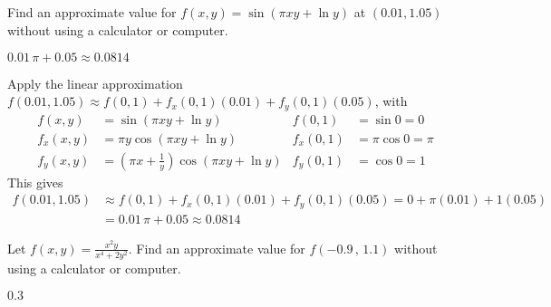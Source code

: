 \subsection*{\Procedural}

\begin{question}
Find an approximate value for $f(x,y)=\sin(\pi xy+\ln y)$ at $(0.01,1.05)$
without using a calculator or computer.
\end{question}

%

\begin{answer}
$0.01\,\pi + 0.05 \approx 0.0814$
\end{answer}

\begin{solution}
Apply the linear approximation 
$f(0.01,1.05)\approx f(0,1)+f_x(0,1)(0.01)+f_y(0,1)(0.05)$,
with 
\begin{align*}
f(x,y)&=\sin(\pi xy+\ln y) & f(0,1)&=\sin 0=0\\
f_x(x,y)&=\pi y\cos(\pi xy+\ln y) & f_x(0,1)&=\pi\cos 0=\pi\\
f_y(x,y)&=\left(\pi x+\frac{1}{y}\right)\cos(\pi xy+\ln y) & 
             f_y(0,1)&=\cos 0=1
\end{align*}
This gives
\begin{align*}
f(0.01,1.05)&\approx f(0,1)+f_x(0,1)(0.01)+f_y(0,1)(0.05)
=0+\pi(0.01)+1(0.05) \\
&=0.01\,\pi + 0.05
\approx 0.0814
\end{align*}

\end{solution}

\begin{question}[M200 2009A] %
Let $\displaystyle f(x,y)=\frac{x^2y}{x^4+2y^2}$.
Find an approximate value for $f (-0.9\,,\, 1.1)$
without using a calculator or computer.
\end{question}

%

\begin{answer}
$0.3$
\end{answer}

